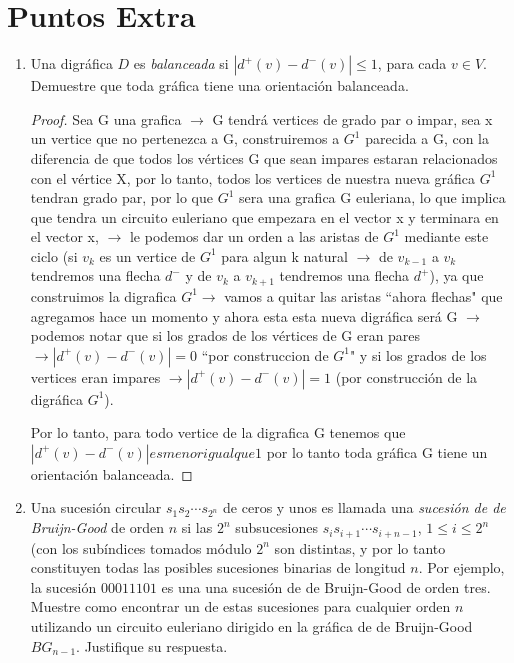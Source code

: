 \documentclass{article}
\begin{document}
\section*{Puntos Extra}
\begin{enumerate}
\item Una digr\'afica $D$ es {\em balanceada} si $|d^+(v) - d^-(v)|
  \le 1$, para cada $v \in V$.   Demuestre que toda gr\'afica tiene
  una orientaci\'on balanceada.

  \begin{proof}


    Sea G una grafica $\rightarrow$ G tendrá vertices de grado par o impar, sea x un vertice que no pertenezca a G, construiremos a $G^1$ parecida a G, con la diferencia de que todos los vértices G que sean impares estaran relacionados con el vértice X, por lo tanto, todos los vertices de nuestra nueva gráfica $G^1$ tendran grado par, por lo que $G^1$ sera una grafica G euleriana, lo que implica que tendra un circuito euleriano que empezara en el vector x y terminara en el vector x, $\rightarrow$ le podemos dar un orden a las aristas de $G^1$ mediante este ciclo (si $v_k$ es un vertice de $G^1$ para algun k natural  $\rightarrow$ de $v_{k-1}$ a $v_k$ tendremos una flecha  $d^-$ y de $v_{k}$ a $v_{k+1}$ tendremos una flecha $d^+$), ya que construimos la digrafica $G^1\rightarrow$ vamos a quitar las aristas ``ahora flechas" que agregamos hace un momento y ahora esta esta nueva digráfica será G $\rightarrow$ podemos notar que si los grados de los vértices de G eran pares $\rightarrow|d^+(v) - d^-(v)| = 0$ ``por construccion de $G^1$" y si los grados de los vertices eran impares $\rightarrow |d^+(v) - d^-(v)|=1$ (por construcción de la digráfica $G^1$).

    Por lo tanto, para todo vertice de la digrafica G tenemos que $|d^+(v) - d^-(v)| es menor igual que 1$ por lo tanto toda gráfica G tiene un orientación balanceada.

    \end{proof}

\item Una sucesi\'on circular $s_1 s_2 \cdots s_{2^n}$ de ceros
  y unos es llamada una {\em sucesi\'on de de Bruijn-Good}
  de orden $n$ si las $2^n$ subsucesiones $s_i s_{i+1} \cdots
  s_{i+n-1}$, $1 \le i \le 2^n$ (con los sub\'indices tomados
  m\'odulo $2^n$ son distintas, y por lo tanto constituyen todas
  las posibles sucesiones binarias de longitud $n$.   Por ejemplo,
  la sucesi\'on $00011101$ es una una sucesi\'on de de Bruijn-Good
  de orden tres.   Muestre como encontrar un de estas sucesiones
  para cualquier orden $n$ utilizando un circuito euleriano dirigido
  en la gr\'afica de de Bruijn-Good $BG_{n-1}$. Justifique su
  respuesta.


\end{enumerate}
\end{document}
